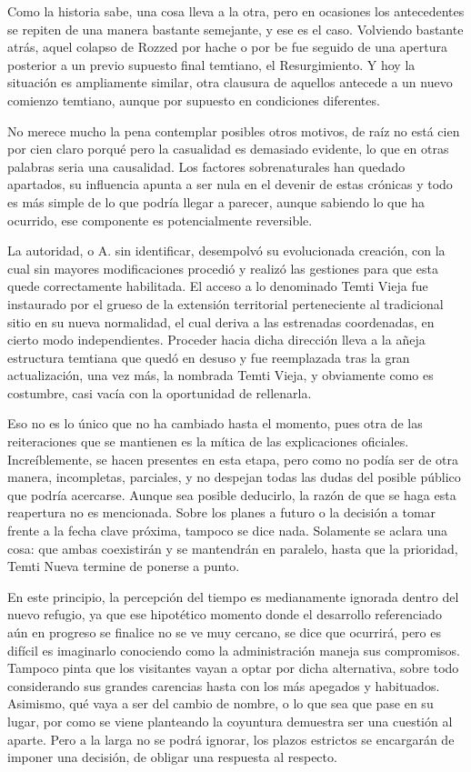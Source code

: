 \documentclass[
]{book}
\begin{document}
Como la historia sabe, una cosa lleva a la otra, pero en ocasiones los antecedentes se repiten de una manera bastante semejante, y ese es el caso. Volviendo bastante atrás, aquel colapso de Rozzed por hache o por be fue seguido de una apertura posterior a un previo supuesto final temtiano, el Resurgimiento. Y hoy la situación es ampliamente similar, otra clausura de aquellos antecede a un nuevo comienzo temtiano, aunque por supuesto en condiciones diferentes.

No merece mucho la pena contemplar posibles otros motivos, de raíz no está cien por cien claro porqué pero la casualidad es demasiado evidente, lo que en otras palabras seria una causalidad. Los factores sobrenaturales han quedado apartados, su influencia apunta a ser nula en el devenir de estas crónicas y todo es más simple de lo que podría llegar a parecer, aunque sabiendo lo que ha ocurrido, ese componente es potencialmente reversible.

La autoridad, o A. sin identificar, desempolvó su evolucionada creación, con la cual sin mayores modificaciones procedió y realizó las gestiones para que esta quede correctamente habilitada. El acceso a lo denominado Temti Vieja fue instaurado por el grueso de la extensión territorial perteneciente al tradicional sitio en su nueva normalidad, el cual deriva a las estrenadas coordenadas, en cierto modo independientes. Proceder hacia dicha dirección lleva a la añeja estructura temtiana que quedó en desuso y fue reemplazada tras la gran actualización, una vez más, la nombrada Temti Vieja, y obviamente como es costumbre, casi vacía con la oportunidad de rellenarla.

Eso no es lo único que no ha cambiado hasta el momento, pues otra de las reiteraciones que se mantienen es la mítica de las explicaciones oficiales. Increíblemente, se hacen presentes en esta etapa, pero como no podía ser de otra manera, incompletas, parciales, y no despejan todas las dudas del posible público que podría acercarse. Aunque sea posible deducirlo, la razón de que se haga esta reapertura no es mencionada. Sobre los planes a futuro o la decisión a tomar frente a la fecha clave próxima, tampoco se dice nada. Solamente se aclara una cosa: que ambas coexistirán y se mantendrán en paralelo, hasta que la prioridad, Temti Nueva termine de ponerse a punto.

En este principio, la percepción del tiempo es medianamente ignorada dentro del nuevo refugio, ya que ese hipotético momento donde el desarrollo referenciado aún en progreso se finalice no se ve muy cercano, se dice que ocurrirá, pero es difícil es imaginarlo conociendo como la administración maneja sus compromisos. Tampoco pinta que los visitantes vayan a optar por dicha alternativa, sobre todo considerando sus grandes carencias hasta con los más apegados y habituados. Asimismo, qué vaya a ser del cambio de nombre, o lo que sea que pase en su lugar, por como se viene planteando la coyuntura demuestra ser una cuestión al aparte. Pero a la larga no se podrá ignorar, los plazos estrictos se encargarán de imponer una decisión, de obligar una respuesta al respecto.
\end{document}
